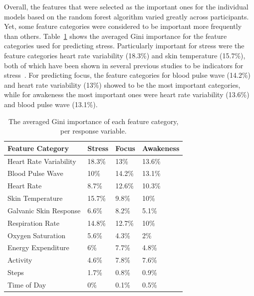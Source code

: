 Overall, the features that were selected as the important ones for the individual models based on the random forest algorithm varied greatly across participants. Yet, some feature categories were considered to be important more frequently than others. Table~\ref{tab:featureImportance} shows the averaged Gini importance for the feature categories used for predicting stress. Particularly important for stress were the feature categories heart rate variability (18.3\%) and skin temperature (15.7\%), both of which have been shown in several previous studies to be  indicators for stress~\cite{dishman2000stress,mcduff16,kataoka00}. For predicting focus, the feature categories for blood pulse wave (14.2\%) and heart rate variability (13\%) showed to be the most important categories, while for awakeness the most important ones were heart rate variability (13.6\%) and blood pulse wave (13.1\%).\\[-0.1cm]


\begin{table}[h!]
  \begin{centering}
  \begin{tabular}{llll}
    \hline
    Feature Category & Stress & Focus & Awakeness\\
    \hline
    Heart Rate Variability & 18.3\% & 13\% & 13.6\%\\
    Blood Pulse Wave & 10\% & 14.2\% & 13.1\%\\
    Heart Rate & 8.7\% & 12.6\% & 10.3\%\\
    Skin Temperature & 15.7\% & 9.8\% & 10\%\\
    Galvanic Skin Response & 6.6\% & 8.2\% & 5.1\%\\
    Respiration Rate & 14.8\% & 12.7\% & 10\%\\
    Oxygen Saturation & 5.6\% & 4.3\% & 2\%\\ 
    Energy Expenditure & 6\% & 7.7\% & 4.8\%\\
    Activity & 4.6\% & 7.8\% & 7.6\%\\
    Steps & 1.7\% & 0.8\% & 0.9\%\\
    Time of Day & 0\% & 0.1\% & 0.5\%\\
    \hline
  \end{tabular}
  \caption{The averaged Gini importance of each feature category, per response variable.}
  \label{tab:featureImportance}
  \end{centering}
  \vspace*{-2mm}
\end{table}


